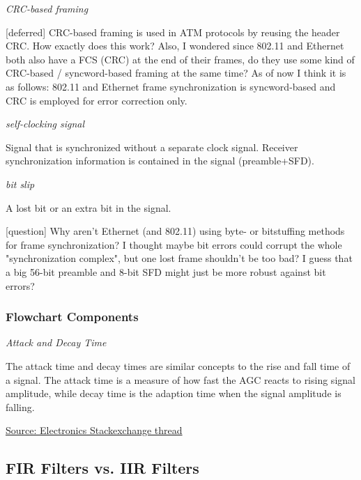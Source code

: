 \documentclass{article}
\begin{document}
\bigskip

\emph{CRC-based framing}

\color{red}
[deferred] CRC-based framing is used in ATM protocols by reusing the header CRC. How exactly does this work? Also, I wondered since 802.11 and Ethernet both also have a FCS (CRC) at the end of their frames, do they use some kind of CRC-based / syncword-based framing at the same time? As of now I think it is as follows: 802.11 and Ethernet frame synchronization is syncword-based and CRC is employed for error correction only.
\color{black}

\bigskip

\emph{self-clocking signal}

Signal that is synchronized without a separate clock signal. Receiver synchronization information is contained in the signal (preamble+SFD).

\bigskip

\emph{bit slip}

A lost bit or an extra bit in the signal.

\bigskip

\color{blue}
[question] Why aren't Ethernet (and 802.11) using byte- or bitstuffing methods for frame synchronization? I thought maybe bit errors could corrupt the whole "synchronization complex", but one lost frame shouldn't be too bad? I guess that a big 56-bit preamble and 8-bit SFD might just be more robust against bit errors?
\color{black}

\subsubsection{Flowchart Components}

\emph{Attack and Decay Time}

The attack time and decay times are similar concepts to the rise and fall time of a signal. The attack time is a measure of how fast the AGC reacts to rising signal amplitude, while decay time is the adaption time when the signal amplitude is falling. 

\medskip

\href{https://electronics.stackexchange.com/questions/269223/attack-and-release-times-of-the-automatic-gain-control}{Source: Electronics Stackexchange thread}

\subsection{FIR Filters vs. IIR Filters}
\end{document}
